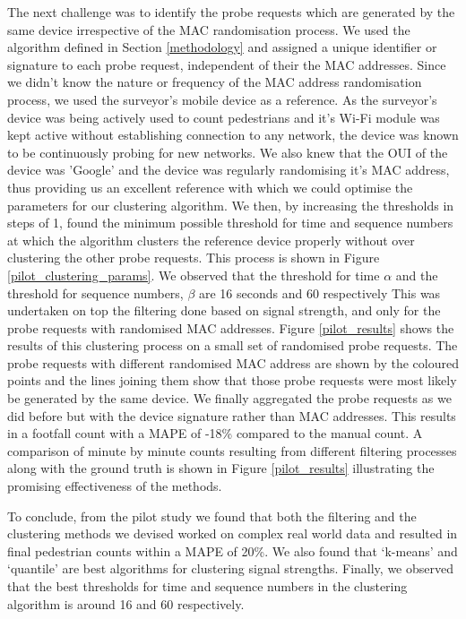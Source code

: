 The next challenge was to identify the probe requests which are generated by the same device irrespective of the MAC randomisation process.
We used the algorithm defined in Section \ref{methodology} and assigned a unique identifier or signature to each probe request, independent of their the MAC addresses.
 Since we didn't know the nature or frequency of the MAC address randomisation process, we used the surveyor's mobile device as a reference.
As the surveyor's device was being actively used to count pedestrians and it's Wi-Fi module was kept active without establishing connection to any network, the device was known to be continuously probing for new networks.
We also knew that the OUI of the device was 'Google' and the device was regularly randomising it's MAC address, thus providing us an excellent reference with which we could optimise the parameters for our clustering algorithm.
We then, by increasing the thresholds in steps of 1, found the minimum possible threshold for time and sequence numbers at which the algorithm clusters the reference device properly without over clustering the other probe requests.
 This process is shown in Figure \ref{pilot_clustering_params}.
We observed that the threshold for time $\alpha$ and the threshold for sequence numbers, $\beta$ are 16 seconds and 60 respectively This was undertaken on top the filtering done based on signal strength, and only for the probe requests with randomised MAC addresses.
Figure \ref{pilot_results} shows the results of this clustering process on a small set of randomised probe requests.
The probe requests with different randomised MAC address are shown by the coloured points and the lines joining them show that those probe requests were most likely be generated by the same device.
We finally aggregated the probe requests as we did before but with the device signature rather than MAC addresses.
This results in a footfall count with a MAPE of -18\% compared to the manual count.
A comparison of minute by minute counts resulting from different filtering processes along with the ground truth is shown in Figure \ref{pilot_results} illustrating the promising effectiveness of the methods.

To conclude, from the pilot study we found that both the filtering and the clustering methods we devised worked on complex real world data and resulted in final pedestrian counts within a MAPE of 20\%.
We also found that `k-means' and `quantile' are best algorithms for clustering signal strengths.
Finally, we observed that the best thresholds for time and sequence numbers in the clustering algorithm is around 16 and 60 respectively.

